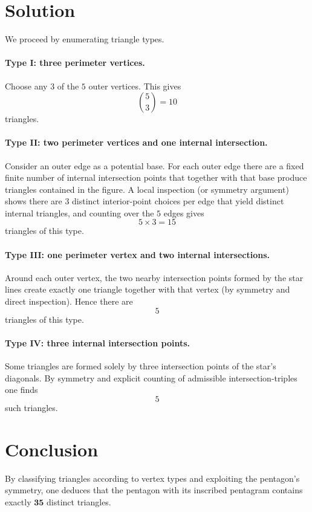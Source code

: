 \documentclass[11pt]{article}
\begin{document}
\section*{Solution}
We proceed by enumerating triangle types.

\paragraph{Type I: three perimeter vertices.}
Choose any $3$ of the $5$ outer vertices. This gives
\[
\binom{5}{3}=10
\]
triangles.

\paragraph{Type II: two perimeter vertices and one internal intersection.}
Consider an outer edge as a potential base. For each outer edge there are a fixed finite number of internal intersection points that together with that base produce triangles contained in the figure. A local inspection (or symmetry argument) shows there are $3$ distinct interior-point choices per edge that yield distinct internal triangles, and counting over the $5$ edges gives
\[
5\times 3 = 15
\]
triangles of this type.

\paragraph{Type III: one perimeter vertex and two internal intersections.}
Around each outer vertex, the two nearby intersection points formed by the star lines create exactly one triangle together with that vertex (by symmetry and direct inspection). Hence there are
\[
5
\]
triangles of this type.

\paragraph{Type IV: three internal intersection points.}
Some triangles are formed solely by three intersection points of the star's diagonals. By symmetry and explicit counting of admissible intersection-triples one finds
\[
5
\]
such triangles.

\medskip
\begin{center}
\end{center}

\section*{Conclusion}
By classifying triangles according to vertex types and exploiting the pentagon's symmetry, one deduces that the pentagon with its inscribed pentagram contains exactly $\mathbf{35}$ distinct triangles.
\end{document}

